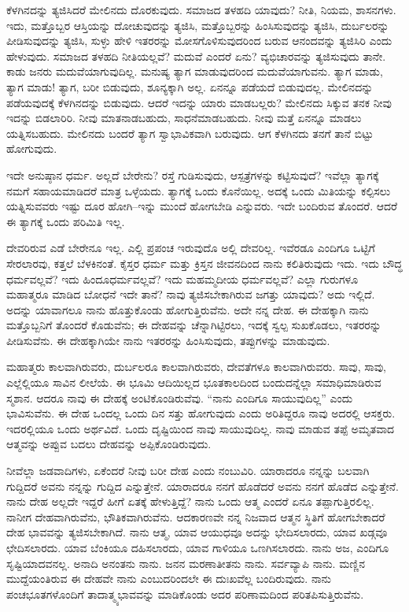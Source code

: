 ಕೆಳಗಿನದನ್ನು ತ್ಯಜಿಸಿದರೆ ಮೇಲಿನದು ದೊರಕುವುದು. ಸಮಾಜದ ತಳಹದಿ ಯಾವುದು? ನೀತಿ, ನಿಯಮ, ಶಾಸನಗಳು. ಇದು, ಮತ್ತೊಬ್ಬರ ಆಸ್ತಿಯನ್ನು ದೋಚುವುದನ್ನು ತ್ಯಜಿಸಿ, ಮತ್ತೊಬ್ಬರನ್ನು ಹಿಂಸಿಸುವುದನ್ನು ತ್ಯಜಿಸಿ, ದುರ್ಬಲರನ್ನು ಪೀಡಿಸುವುದನ್ನು ತ್ಯಜಿಸಿ, ಸುಳ್ಳು ಹೇಳಿ ಇತರರನ್ನು ಮೋಸಗೊಳಿಸುವುದರಿಂದ ಬರುವ ಆನಂದವನ್ನು ತ್ಯಜಿಸಿರಿ ಎಂದು ಹೇಳುವುದು. ಸಮಾಜದ ತಳಹದಿ ನೀತಿಯಲ್ಲವೆ? ಮದುವೆ ಎಂದರೆ ಏನು? ವ್ಯಭಿಚಾರವನ್ನು ತ್ಯಜಿಸುವುದು ತಾನೇ. ಕಾಡು ಜನರು ಮದುವೆಯಾಗುವುದಿಲ್ಲ. ಮನುಷ್ಯ ತ್ಯಾಗ ಮಾಡುವುದರಿಂದ ಮದುವೆಯಾಗುವನು. ತ್ಯಾಗ ಮಾಡು, ತ್ಯಾಗ ಮಾಡು! ತ್ಯಾಗ, ಬರೀ ಬಿಡುವುದು, ಶೂನ್ಯಕ್ಕಾಗಿ ಅಲ್ಲ. ಏನನ್ನೂ ಪಡೆಯದೆ ಬಿಡುವುದಲ್ಲ. ಮೇಲಿನದನ್ನು ಪಡೆಯವುದಕ್ಕೆ ಕೆಳಗಿನದನ್ನು ಬಿಡುವುದು. ಆದರೆ ಇದನ್ನು ಯಾರು ಮಾಡಬಲ್ಲರು? ಮೇಲಿನದು ಸಿಕ್ಕುವ ತನಕ ನೀವು ಇದನ್ನು ಬಿಡಲಾರಿರಿ. ನೀವು ಮಾತನಾಡಬಹುದು, ಸಾಧನೆಮಾಡಬಹುದು. ನೀವು ಮತ್ತೆ ಏನನ್ನೂ ಮಾಡಲು ಯತ್ನಿಸಬಹುದು. ಮೇಲಿನದು ಬಂದರೆ ತ್ಯಾಗ ಸ್ವಾಭಾವಿಕವಾಗಿ ಬರುವುದು. ಆಗ ಕೆಳಗಿನದು ತನಗೆ ತಾನೆ ಬಿಟ್ಟು ಹೋಗುವುದು.

ಇದೇ ಅನುಷ್ಠಾನ ಧರ್ಮ. ಅಲ್ಲದೆ ಬೇರೇನು? ರಸ್ತೆ ಗುಡಿಸುವುದು, ಆಸ್ಪತ್ರೆಗಳನ್ನು ಕಟ್ಟಿಸುವುದೆ? ಇವೆಲ್ಲಾ ತ್ಯಾಗಕ್ಕೆ ನಮಗೆ ಸಹಾಯಮಾಡಿದರೆ ಮಾತ್ರ ಒಳ್ಳೆಯದು. ತ್ಯಾಗಕ್ಕೆ ಒಂದು ಕೊನೆಯಿಲ್ಲ. ಅದಕ್ಕೆ ಒಂದು ಮಿತಿಯನ್ನು ಕಲ್ಪಿಸಲು ಯತ್ನಿಸುವವರು ಇಷ್ಟು ದೂರ ಹೋಗಿ–ಇನ್ನು ಮುಂದೆ ಹೋಗಬೇಡಿ ಎನ್ನುವರು. ಇದೇ ಬಂದಿರುವ ತೊಂದರೆ. ಆದರೆ ಈ ತ್ಯಾಗಕ್ಕೆ ಒಂದು ಪರಿಮಿತಿ ಇಲ್ಲ.

ದೇವರಿರುವ ಎಡೆ ಬೇರೇನೂ ಇಲ್ಲ. ಎಲ್ಲಿ ಪ್ರಪಂಚ ಇರುವುದೊ ಅಲ್ಲಿ ದೇವರಿಲ್ಲ. ಇವೆರಡೂ ಎಂದಿಗೂ ಒಟ್ಟಿಗೆ ಸೇರಲಾರವು, ಕತ್ತಲೆ ಬೆಳಕಿನಂತೆ. ಕೈಸ್ತರ ಧರ್ಮ ಮತ್ತು ಕ್ರಿಸ್ತನ ಜೀವನದಿಂದ ನಾನು ಕಲಿತಿರುವುದು ಇದು. ಇದು ಬೌದ್ಧ ಧರ್ಮವಲ್ಲವೆ? ಇದು ಹಿಂದೂಧರ್ಮವಲ್ಲವೆ? ಇದು ಮಹಮ್ಮದೀಯ ಧರ್ಮವಲ್ಲವೆ? ಎಲ್ಲಾ ಗುರುಗಳೂ ಮಹಾತ್ಮರೂ ಮಾಡಿದ ಬೋಧನೆ ಇದೇ ತಾನೆ? ನಾವು ತ್ಯಜಿಸಬೇಕಾಗಿರುವ ಜಗತ್ತು ಯಾವುದು? ಅದು ಇಲ್ಲಿದೆ. ಅದನ್ನು ಯಾವಾಗಲೂ ನಾನು ಹೊತ್ತುಕೊಂಡು ಹೋಗುತ್ತಿರುವೆನು. ಅದೇ ನನ್ನ ದೇಹ. ಈ ದೇಹಕ್ಕಾಗಿ ನಾನು ಮತ್ತೊಬ್ಬನಿಗೆ ತೊಂದರೆ ಕೊಡುವೆನು; ಈ ದೇಹವನ್ನು ಚೆನ್ನಾಗಿಟ್ಟಿರಲು, ಇದಕ್ಕೆ ಸ್ವಲ್ಪ ಸುಖಕೊಡಲು, ಇತರರನ್ನು ಪೀಡಿಸುವೆನು. ಈ ದೇಹಕ್ಕಾಗಿಯೇ ನಾನು ಇತರರನ್ನು ಹಿಂಸಿಸುವುದು, ತಪ್ಪುಗಳನ್ನು ಮಾಡುವುದು.

ಮಹಾತ್ಮರು ಕಾಲವಾಗಿರುವರು, ದುರ್ಬಲರೂ ಕಾಲವಾಗಿರುವರು, ದೇವತೆಗಳೂ ಕಾಲವಾಗಿರುವರು. ಸಾವು, ಸಾವು, ಎಲ್ಲೆಲ್ಲಿಯೂ ಸಾವಿನ ಲೀಲೆಯೆ. ಈ ಭೂಮಿ ಆದಿಯಿಲ್ಲದ ಭೂತಕಾಲದಿಂದ ಬಂದುದನ್ನೆಲ್ಲಾ ಸಮಾಧಿಮಾಡಿರುವ ಸ್ಮಶಾನ. ಆದರೂ ನಾವು ಈ ದೇಹಕ್ಕೆ ಅಂಟಿಕೊಂಡಿರುವೆವು. “ನಾನು ಎಂದಿಗೂ ಸಾಯುವುದಿಲ್ಲ” ಎಂದು ಭಾವಿಸುವೆನು. ಈ ದೇಹ ಒಂದಲ್ಲ ಒಂದು ದಿನ ಸತ್ತು ಹೋಗುವುದು ಎಂದು ಅರಿತಿದ್ದರೂ ನಾವು ಅದರಲ್ಲಿ ಆಸಕ್ತರು. ಇದರಲ್ಲಿಯೂ ಒಂದು ಅರ್ಥವಿದೆ. ಒಂದು ದೃಷ್ಟಿಯಿಂದ ನಾವು ಸಾಯುವುದಿಲ್ಲ. ನಾವು ಮಾಡುವ ತಪ್ಪೆ ಅಮೃತವಾದ ಆತ್ಮವನ್ನು ಅಪ್ಪುವ ಬದಲು ದೇಹವನ್ನು ಅಪ್ಪಿಕೊಂಡಿರುವುದು.

ನೀವೆಲ್ಲಾ ಜಡವಾದಿಗಳು, ಏಕೆಂದರೆ ನೀವು ಬರೀ ದೇಹ ಎಂದು ನಂಬುವಿರಿ. ಯಾರಾದರೂ ನನ್ನನ್ನು ಬಲವಾಗಿ ಗುದ್ದಿದರೆ ಅವನು ನನ್ನನ್ನು ಗುದ್ದಿದ ಎನ್ನುತ್ತೇನೆ. ಯಾರಾದರೂ ನನಗೆ ಹೊಡೆದರೆ ಅವನು ನನಗೆ ಹೊಡೆದ ಎನ್ನುತ್ತೇನೆ. ನಾನು ದೇಹ ಅಲ್ಲದೇ ಇದ್ದರೆ ಹೀಗೆ ಏತಕ್ಕೆ ಹೇಳುತ್ತಿದ್ದೆ? ನಾನು ಒಂದು ಆತ್ಮ ಎಂದರೆ ಏನೂ ತಪ್ಪಾಗುತ್ತಿರಲಿಲ್ಲ. ನಾನೀಗ ದೇಹವಾಗಿರುವೆನು, ಭೌತಿಕವಾಗಿರುವೆನು. ಆದಕಾರಣವೇ ನನ್ನ ನಿಜವಾದ ಆತ್ಮನ ಸ್ಥಿತಿಗೆ ಹೋಗಬೇಕಾದರೆ ದೇಹ ಭಾವವನ್ನು ತ್ಯಜಿಸಬೇಕಾಗಿದೆ. ನಾನು ಆತ್ಮ, ಯಾವ ಆಯುಧವೂ ಅದನ್ನು ಭೇದಿಸಲಾರದು, ಯಾವ ಖಡ್ಗವೂ ಛೇದಿಸಲಾರದು. ಯಾವ ಬೆಂಕಿಯೂ ದಹಿಸಲಾರದು, ಯಾವ ಗಾಳಿಯೂ ಒಣಗಿಸಲಾರದು. ನಾನು ಅಜ, ಎಂದಿಗೂ ಸೃಷ್ಟಿಯಾದವನಲ್ಲ. ಅನಾದಿ ಅನಂತನು ನಾನು. ಜನನ ಮರಣಾತೀತನು ನಾನು. ಸರ್ವವ್ಯಾಪಿ ನಾನು. ಮಣ್ಣಿನ ಮುದ್ದೆಯಂತಿರುವ ಈ ದೇಹವೇ ನಾನು ಎಂಬುದರಿಂದಲೇ ಈ ದುಃಖವೆಲ್ಲ ಬಂದಿರುವುದು. ನಾನು ಪಂಚಭೂತಗಳೊಂದಿಗೆ ತಾದಾತ್ಮ್ಯಭಾವವನ್ನು ಮಾಡಿಕೊಂಡು ಅದರ ಪರಿಣಾಮದಿಂದ ಪರಿತಪಿಸುತ್ತಿರುವೆನು.

